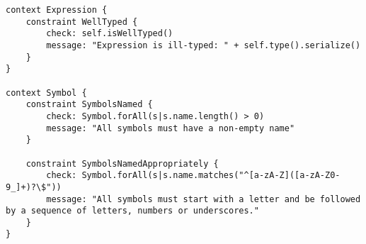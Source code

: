 \documentclass[11pt,fleqn]{article}
\begin{document}
\begin{lstlisting}[caption={Constraints and Critiques},label={lst:constraints-and-critiques}]
context Expression {
    constraint WellTyped {
        check: self.isWellTyped()
        message: "Expression is ill-typed: " + self.type().serialize()
    }
}

context Symbol {
    constraint SymbolsNamed {
        check: Symbol.forAll(s|s.name.length() > 0)
        message: "All symbols must have a non-empty name"
    }

    constraint SymbolsNamedAppropriately {
        check: Symbol.forAll(s|s.name.matches("^[a-zA-Z]([a-zA-Z0-9_]+)?\$"))
        message: "All symbols must start with a letter and be followed by a sequence of letters, numbers or underscores."
    }
}
\end{lstlisting}
\end{document}

